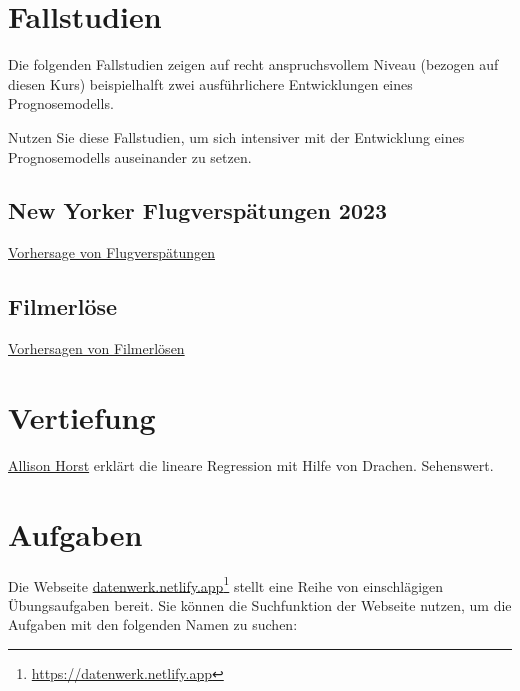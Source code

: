 \documentclass[
  a4paper,
]{scrbook}
\theoremstyle{definition}
\theoremstyle{definition}
\theoremstyle{definition}
\theoremstyle{remark}
\begin{document}
\section{Fallstudien}\label{fallstudien-2}

Die folgenden Fallstudien zeigen auf recht anspruchsvollem Niveau
(bezogen auf diesen Kurs) beispielhalft zwei ausführlichere
Entwicklungen eines Prognosemodells.

Nutzen Sie diese Fallstudien, um sich intensiver mit der Entwicklung
eines Prognosemodells auseinander zu setzen.

\subsection{New Yorker Flugverspätungen
2023}\label{new-yorker-flugverspuxe4tungen-2023}

\href{https://datenwerk.netlify.app/posts/flights-delay-simplified//}{Vorhersage
von Flugverspätungen}

\subsection{Filmerlöse}\label{filmerluxf6se}

\href{https://data-se.netlify.app/2020/11/13/fallstudie-zur-regressionsanalyse-ggplot2movies/}{Vorhersagen
von Filmerlösen}

\section{Vertiefung}\label{vertiefung-7}

\href{https://allisonhorst.com/linear-regression-dragons}{Allison Horst}
erklärt die lineare Regression mit Hilfe von Drachen. Sehenswert.

\section{Aufgaben}\label{aufgaben-8}

Die Webseite
\href{https://datenwerk.netlify.app}{datenwerk.netlify.app}\footnote{\url{https://datenwerk.netlify.app}}
stellt eine Reihe von einschlägigen Übungsaufgaben bereit. Sie können
die Suchfunktion der Webseite nutzen, um die Aufgaben mit den folgenden
Namen zu suchen:
\end{document}

